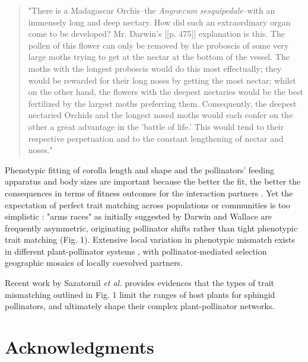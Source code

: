 \documentclass[a4paper,12pt]{article}
\begin{document}
\begin{spacing}{1.0}
	\begin{quotation}
	 "There is a Madagascar Orchis--the \textit{Angræcum sesquipedale}--with an immensely long and deep nectary. How did such an extraordinary organ come to be developed? Mr. Darwin's [[p. 475]] explanation is this. The pollen of this flower can only be removed by the proboscis of some very large moths trying to get at the nectar at the bottom of the vessel. The moths with the longest proboscis would do this most effectually; they would be rewarded for their long noses by getting the most nectar; whilst on the other hand, the flowers with the deepest nectaries would be the best fertilized by the largest moths preferring them. Consequently, the deepest nectaried Orchids and the longest nosed moths would each confer on the other a great advantage in the 'battle of life.' This would tend to their respective perpetuation and to the constant lengthening of nectar and noses."
	 \end{quotation}
 \end{spacing}
 
 Phenotypic fitting of corolla length and shape and the pollinators' feeding apparatus and body sizes are important because the better the fit, the better the consequences in terms of fitness outcomes for the interaction partners \citep{Nilsson:1988}. Yet the expectation of perfect trait matching across populations or communities is too simplistic \citep{Anderson:2010}: "arms races" as initially suggested by Darwin and Wallace are frequently asymmetric, originating pollinator shifts rather than tight phenotypic trait matching (Fig. 1). Extensive local variation in phenotypic mismatch exists in different plant-pollinator systems \citep[e.g., ][]{Cocucci:2009,Anderson:2010,More:2012}, with pollinator-mediated selection geographic mosaics of locally coevolved partners.
 
Recent work by Sazatornil \textit{et al.} \citep{Sazatornil:2016} provides evidences that the types of trait mismatching outlined in Fig. 1 limit the ranges of host plants for sphingid pollinators, and ultimately shape their complex plant-pollinator networks. 
 


\section*{Acknowledgments}
\end{document}

